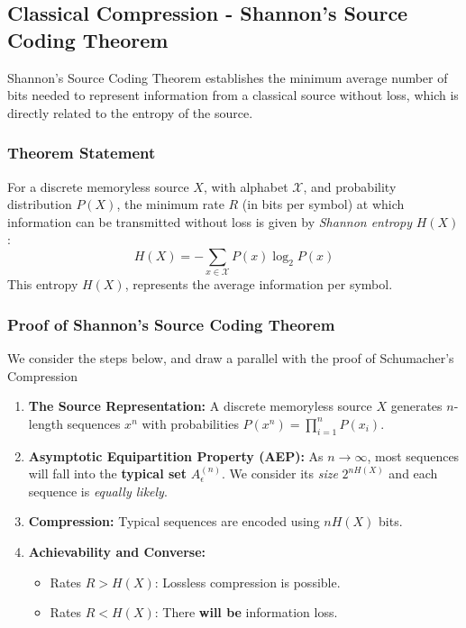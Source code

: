 \subsection{Classical Compression - Shannon's Source Coding Theorem}

Shannon’s Source Coding Theorem establishes the minimum average number of bits needed to represent information from a classical source without loss, which is directly related to the entropy of the source.

\subsubsection{Theorem Statement}
For a discrete memoryless source \(X\), with alphabet \(\mathcal{X}\), and probability distribution \(P(X)\), the minimum rate \(R\) (in bits per symbol) at which information can be transmitted without loss is given by \textit{Shannon entropy} \(H(X)\):
\[
H(X) = -\sum_{x \in \mathcal{X}} P(x) \log_2 P(x)
\]
This entropy \(H(X)\), represents the average information per symbol.

\subsubsection{Proof of Shannon's Source Coding Theorem}
We consider the steps below, and draw a parallel with the proof of Schumacher's Compression 

\begin{enumerate}
    \item \textbf{The Source Representation:} A discrete memoryless source \(X\) generates \(n\)-length sequences \(x^n\) with probabilities \(P(x^n) = \prod_{i=1}^n P(x_i)\).
    \item \textbf{Asymptotic Equipartition Property (AEP):} As \(n \to \infty\), most sequences will fall into the \textbf{typical set} \(A_\epsilon^{(n)}\).  We consider its \textit{size} \(2^{nH(X)}\) and each sequence is  \textit{equally likely}. 
    \item \textbf{Compression:} Typical sequences are encoded using \(nH(X)\) bits. 
    \item \textbf{Achievability and Converse:}
    \begin{itemize}
        \item Rates \(R > H(X)\): Lossless compression is possible.
        \item Rates \(R < H(X)\): There \textbf{will be} information loss.
    \end{itemize}
\end{enumerate}

